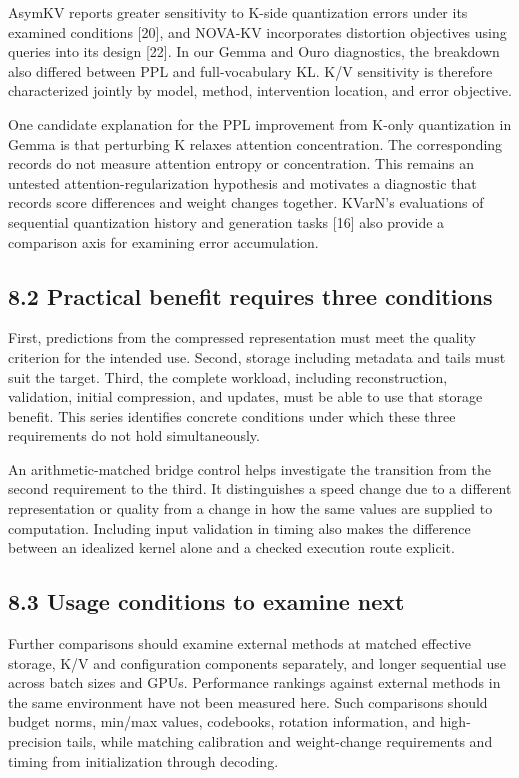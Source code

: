 \documentclass[10pt,a4paper]{article}
\begin{document}
AsymKV reports greater sensitivity to K-side quantization errors under its examined conditions {[}20{]}, and NOVA-KV incorporates distortion objectives using queries into its design {[}22{]}. In our Gemma and Ouro diagnostics, the breakdown also differed between PPL and full-vocabulary KL. K/V sensitivity is therefore characterized jointly by model, method, intervention location, and error objective.

One candidate explanation for the PPL improvement from K-only quantization in Gemma is that perturbing K relaxes attention concentration. The corresponding records do not measure attention entropy or concentration. This remains an untested attention-regularization hypothesis and motivates a diagnostic that records score differences and weight changes together. KVarN's evaluations of sequential quantization history and generation tasks {[}16{]} also provide a comparison axis for examining error accumulation.

\subsection{8.2 Practical benefit requires three conditions}\label{practical-benefit-requires-three-conditions}

First, predictions from the compressed representation must meet the quality criterion for the intended use. Second, storage including metadata and tails must suit the target. Third, the complete workload, including reconstruction, validation, initial compression, and updates, must be able to use that storage benefit. This series identifies concrete conditions under which these three requirements do not hold simultaneously.

An arithmetic-matched bridge control helps investigate the transition from the second requirement to the third. It distinguishes a speed change due to a different representation or quality from a change in how the same values are supplied to computation. Including input validation in timing also makes the difference between an idealized kernel alone and a checked execution route explicit.

\subsection{8.3 Usage conditions to examine next}\label{usage-conditions-to-examine-next}

Further comparisons should examine external methods at matched effective storage, K/V and configuration components separately, and longer sequential use across batch sizes and GPUs. Performance rankings against external methods in the same environment have not been measured here. Such comparisons should budget norms, min/max values, codebooks, rotation information, and high-precision tails, while matching calibration and weight-change requirements and timing from initialization through decoding.
\end{document}
